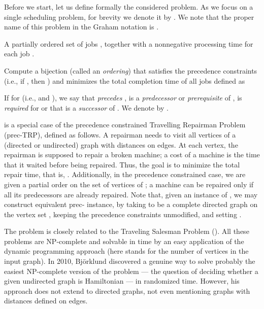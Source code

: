 \documentclass{article}
\theoremstyle{definition}
\begin{document}
Before we start, let us define formally the considered problem.
As we focus on a single scheduling problem, for brevity we
denote it by \schedname{}. We note that the proper name of this problem in the Graham notation
    is \schedlongname{}.

{A partially ordered set of jobs ,
together with a nonnegative processing time  for each job .
}
{
Compute a bijection  (called an {\em{ordering}})
that satisfies the precedence constraints (i.e., if , then )
and minimizes the total completion time of all jobs defined as

}

If  for  (i.e.,  and ),
we say that  {\em{precedes}} ,  is a {\em{predecessor}}
or {\em{prerequisite}} of ,  is {\em{required}} for  or that  is a {\em{successor}}
of . We denote  by .

\schedname{} is a special case of the precedence constrained Travelling Repairman Problem (prec-{\sc TRP}), defined as follows. A repairman needs to visit all vertices of a (directed
or undirected) graph  with distances  on edges.
At each vertex, the repairman is supposed to repair a broken machine;
a cost of a machine  is the time  that it waited before being repaired.
Thus, the goal is to minimize the total repair time, that is, .
Additionally, in the precedence constrained case, we are given a partial order 
on the set of vertices of ; a machine can be repaired only if all its predecessors
are already repaired.
Note that, given an instance  of \schedname{},
we may construct equivalent prec-{} instance, by taking  to be a complete directed
graph on the vertex set , keeping the precedence constraints unmodified, and setting
.

The {} problem is closely related to the Traveling Salesman Problem ({}).
All these problems are NP-complete and solvable in  time by
an easy application of the dynamic programming approach (here  stands for the number
of vertices in the input graph).
In 2010, Bj\"{o}rklund \cite{bjorklund-focs} discovered a genuine way to solve
probably the easiest NP-complete version of the {} problem --- the question
of deciding whether a given undirected graph is Hamiltonian --- in randomized
 time. However, his approach does not extend to directed graphs,
not even mentioning graphs with distances defined on edges.
\end{document}
